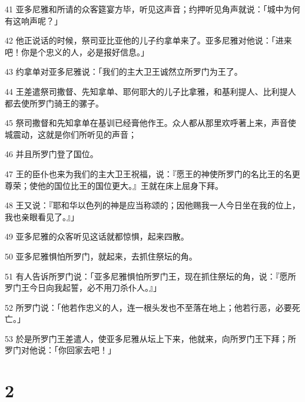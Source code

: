 \par 41 亚多尼雅和所请的众客筵宴方毕，听见这声音；约押听见角声就说：「城中为何有这响声呢？」
\par 42 他正说话的时候，祭司亚比亚他的儿子约拿单来了。亚多尼雅对他说：「进来吧！你是个忠义的人，必是报好信息。」
\par 43 约拿单对亚多尼雅说：「我们的主大卫王诚然立所罗门为王了。
\par 44 王差遣祭司撒督、先知拿单、耶何耶大的儿子比拿雅，和基利提人、比利提人都去使所罗门骑王的骡子。
\par 45 祭司撒督和先知拿单在基训已经膏他作王。众人都从那里欢呼著上来，声音使城震动，这就是你们所听见的声音；
\par 46 并且所罗门登了国位。
\par 47 王的臣仆也来为我们的主大卫王祝福，说：『愿王的神使所罗门的名比王的名更尊荣；使他的国位比王的国位更大。』王就在床上屈身下拜。
\par 48 王又说：『耶和华以色列的神是应当称颂的；因他赐我一人今日坐在我的位上，我也亲眼看见了。』」
\par 49 亚多尼雅的众客听见这话就都惊惧，起来四散。
\par 50 亚多尼雅惧怕所罗门，就起来，去抓住祭坛的角。
\par 51 有人告诉所罗门说：「亚多尼雅惧怕所罗门王，现在抓住祭坛的角，说：『愿所罗门王今日向我起誓，必不用刀杀仆人。』」
\par 52 所罗门说：「他若作忠义的人，连一根头发也不至落在地上；他若行恶，必要死亡。」
\par 53 於是所罗门王差遣人，使亚多尼雅从坛上下来，他就来，向所罗门王下拜；所罗门对他说：「你回家去吧！」

\chapter{2}

